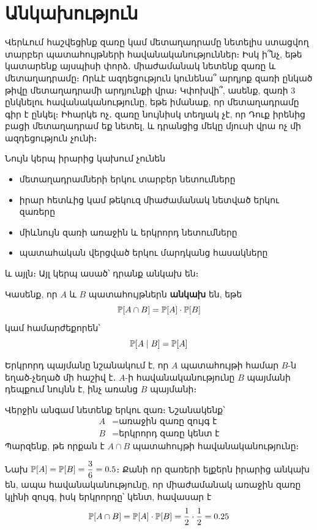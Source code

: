 \section{Անկախություն}

Վերևում հաշվեցինք զառը կամ մետաղադրամը նետելիս ստացվող տարբեր պատահույթների հավանականություններ։ Իսկ ի՞նչ, եթե կա\-տա\-րենք այսպիսի փորձ․ միաժամանակ նետենք զառը և մետաղադրամը։ Որևէ ազդեցություն կունենա՞ արդյոք զառի ընկած թիվը մետաղադրամի արդյունքի վրա։ Կփոխվի՞, ասենք, զառի $3$ ընկնելու հավանականու\-թյու\-նը, եթե իմանաք, որ մետաղադրամը գիր է ընկել։ Իհարկե ոչ․ զառը նույն\-իսկ տեղյակ չէ, որ Դուք իրենից բացի մետաղադրամ եք նետել, և դրան\-ցից մեկը մյուսի վրա ոչ մի ազդեցություն չունի։

Նույն կերպ իրարից կախում չունեն 
\begin{itemize}
    \item մետաղադրամների երկու տարբեր նետումները
    \item իրար հետևից կամ թեկուզ միաժամանակ նետված երկու զառերը
    \item միևնույն զառի առաջին և երկրորդ նետումները
    \item պատահական վերցված երկու մարդկանց հասակները
\end{itemize}
և այլն։ Այլ կերպ ասած՝ դրանք անկախ են։

\begin{definition}
Կասենք, որ $A$ և $B$ պատահույթներն \textbf{անկախ} են, եթե 
\[
\mathbb{P}[A \cap B] = \mathbb{P}[A] \cdot \mathbb{P}[B]
\]
կամ համարժեքորեն՝
\[
\mathbb{P}[A \mid B] = \mathbb{P}[A]
\]
\end{definition}

Երկրորդ պայմանը նշանակում է, որ $A$ պատահույթի համար $B$-ն եղած-չեղած մի հաշիվ է․ $A$-ի հավանականությունը $B$ պայմանի դեպքում նույնն է, ինչ առանց $B$ պայմանի։  

\begin{example}
Վերջին անգամ նետենք երկու զառ։ Նշանակենք՝
\begin{align*}
    A &= \text{առաջին զառը զույգ է} \\
    B &= \text{երկրորդ զառը կենտ է}
\end{align*}
Պարզենք, թե որքան է $A \cap B$ պատահույթի հավանականությունը։

Նախ $\mathbb{P}[A] = \mathbb{P}[B] = \dfrac{3}{6} = 0.5$։ Քանի որ զառերի ելքերն իրարից անկախ են, ապա հավանականությունը, որ միաժամանակ առաջին զառը կլինի զույգ, իսկ երկրորդը՝ կենտ, հավասար է
\[
\mathbb{P}[A \cap B] = \mathbb{P}[A] \cdot \mathbb{P}[B] = \frac{1}{2} \cdot \frac{1}{2} = 0.25
\]
\end{example}

